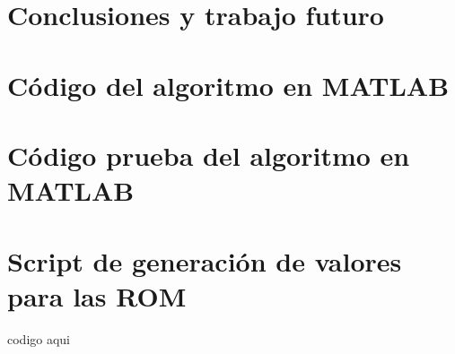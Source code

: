 \documentclass[a4paper, 11pt, oneside, openright]{report}
\begin{document}
\chapter{Conclusiones y trabajo futuro}


\begin{appendices}
\chapter{\label{ap:algoritmo}Código del algoritmo en MATLAB}

\chapter{\label{ap:pruebaalgoritmo}Código prueba del algoritmo en MATLAB}

\chapter{\label{ap:script}Script de generación de valores para las ROM}
codigo aqui
\end{appendices}
\end{document}
